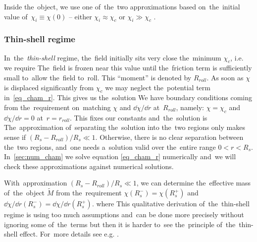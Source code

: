 Inside the~object, we use one of~the~two approximations based on~the~initial value of~$\chi_i\equiv\chi(0)$ -- either $\chi_i\approx\chi_c$ or $\chi_i\gg\chi_c$ .
\subsubsection{Thin-shell regime}
In~the~\textit{thin-shell} regime, the~field initially sits very close the~minimum $\chi_c$, i.e. we require
The~field is frozen near this value until the~friction term is sufficiently small to~allow the~field to~roll. This ``moment'' is denoted by $R_{roll}$. As soon as $\chi$ is displaced significantly from $\chi_c$ we may neglect the~potential term in~\eqref{eq_cham_r}. This gives us the~solution
We have boundary conditions coming from the~requirement on~matching $\chi$ and $\dd\chi/\dd r$ at~$R_{roll}$, namely: $\chi=\chi_c$ and~$\dd\chi/\dd r=0$ at~$r=r_{roll}$. This fixes our constants and~the~solution is
The~approximation of~separating the~solution into the~two regions only makes sense if $(R_s-R_{roll})/R_s\ll1$. Otherwise, there is no clear separation between the~two regions, and~one needs a~solution valid over the~entire range $0<r<R_s$. In~\autoref{sec:num_cham} we solve equation \eqref{eq_cham_r} numerically and~we will check these approximations against numerical solutions.

With~approximation $(R_s-R_{roll})/R_s\ll1$, we can determine the~effective mass of~the~object $\tilde{M}$ from the~requirement $\chi(R_s^-)=\chi(R_s^+)$ and~$\dd\chi/\dd r(R_s^-)=\dd\chi/\dd r(R_s^+)$.
where
This qualitative derivation of~the~thin-shell regime is using too much assumptions and~can be done more precisely without ignoring some of~the~terms but then it is harder to~see the~principle of~the~thin-shell effect. For~more details see e.g. \textcite{Tamaki:2008mf,2007PhRvD..75f3501M,Waterhouse:2006wv}.
